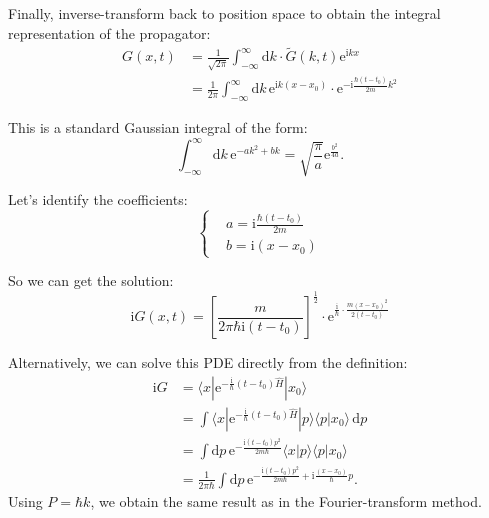 \begin{example}
    Finally, inverse-transform back to position space to obtain the integral representation of the propagator:
    \begin{equation}
    \begin{aligned}
    G(x,t) &= \frac{1}{\sqrt{2\pi}} \int_{-\infty}^{\infty} \mathrm{d}k \cdot \tilde{G}(k,t) \mathrm{e}^{\mathrm{i}kx} \\
    &= \frac{1}{2\pi} \int_{-\infty}^{\infty} \mathrm{d}k \, \mathrm{e}^{\mathrm{i}k(x-x_0)} \cdot \mathrm{e}^{-\mathrm{i}\frac{\hbar(t-t_0)}{2m}k^2}
    \end{aligned}
    \end{equation}

    This is a standard Gaussian integral of the form:
    \begin{equation}
    \int_{-\infty}^{\infty} \mathrm{d}k \, \mathrm{e}^{-ak^2+bk} = \sqrt{\frac{\pi}{a}} \mathrm{e}^{\frac{b^2}{4a}}.
    \end{equation}

    Let's identify the coefficients:
    \begin{equation}
    \left\{
    \begin{aligned}
    &a = \mathrm{i} \frac{\hbar(t-t_0)}{2m} \\
    &b = \mathrm{i}(x-x_0)
    \end{aligned}
    \right.
    \end{equation}

    So we can get the solution:
    \begin{equation}
        \mathrm{i}G(x,t) 
        = \left[ \frac{m}{2\pi\hbar\mathrm{i}(t-t_0)} \right]^{\frac{1}{2}} \cdot \mathrm{e}^{\frac{\mathrm{i}}{\hbar} 
        \cdot \frac{m(x-x_0)^2}{2(t-t_0)}}
    \end{equation}

    Alternatively, we can solve this PDE directly from the definition:
    \begin{equation}
    \begin{aligned}
    \mathrm{i}G &= \langle x | \mathrm{e}^{-\frac{\mathrm{i}}{\hbar}(t-t_0)\hat{H}} | x_0 \rangle \\
    &= \int \langle x | \mathrm{e}^{-\frac{\mathrm{i}}{\hbar}(t-t_0)\hat{H}} | p \rangle \langle p | x_0 \rangle \, \mathrm{d}p \\
    &= \int \mathrm{d}p \, \mathrm{e}^{-\frac{\mathrm{i}(t-t_0)p^2}{2m\hbar}} \langle x | p \rangle \langle p | x_0 \rangle \\
    &= \frac{1}{2\pi\hbar} \int \mathrm{d}p \, \mathrm{e}^{-\frac{\mathrm{i}(t-t_0)p^2}{2m\hbar} + \mathrm{i}\frac{(x-x_0)}{\hbar}p}.
    \end{aligned}
    \end{equation}
    Using $P = \hbar k$, we obtain the same result as in the Fourier-transform method.

\end{example}


